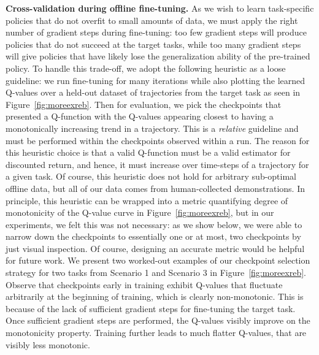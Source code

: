 \textbf{Cross-validation during offline fine-tuning.} As we wish to learn task-specific policies that do not overfit to small amounts of data, we must apply the right number of gradient steps during fine-tuning: too few gradient steps will produce policies that do not succeed at the target tasks, while too many gradient steps will give policies that have likely lose the generalization ability of the pre-trained policy. {To handle this trade-off, we adopt the following heuristic as a loose guideline:} we run fine-tuning for many iterations while also plotting the learned Q-values over a held-out dataset of trajectories from the target task as seen in Figure~\ref{fig:moreexreb}. Then for evaluation, we pick the checkpoints that presented a Q-function with the Q-values appearing closest to having a monotonically increasing trend in a trajectory. This is a \emph{relative} guideline and must be performed within the checkpoints observed within a run. The reason for this heuristic choice is that a valid Q-function must be a valid estimator for discounted return, and hence, it must increase over time-steps of a trajectory for a given task.  Of course, this heuristic does not hold for arbitrary sub-optimal offline data, but all of our data comes from human-collected demonstrations. In principle, this heuristic can be wrapped into a metric quantifying degree of monotonicity of the Q-value curve in Figure~\ref{fig:moreexreb}, but in our experiments, we felt this was not necessary: as we show below, we were able to narrow down the checkpoints to essentially one or at most, two checkpoints by just visual inspection. Of course, designing an accurate metric would be helpful for future work. We present two worked-out examples of our checkpoint selection strategy for two tasks from Scenario 1 and Scenario 3 in Figure~\ref{fig:moreexreb}. Observe that checkpoints early in training exhibit Q-values that fluctuate arbitrarily at the beginning of training, which is clearly non-monotonic. This is because of the lack of sufficient gradient steps for fine-tuning the target task. Once sufficient gradient steps are performed, the Q-values visibly improve on the monotonicity property. Training further leads to much flatter Q-values, that are visibly less monotonic. 


